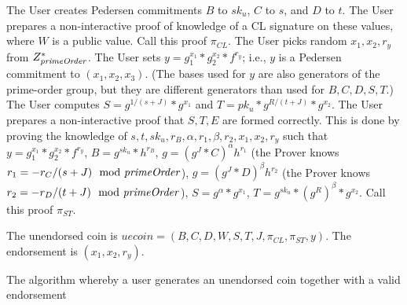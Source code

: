 \begin{algorithm}[H]\label{spendEndorsed}
\dontprintsemicolon

\BlankLine

 \;
\Indp
  The User creates Pedersen commitments $B$ to $sk_u$, $C$ to $s$, and $D$ to $t$. The User prepares a non-interactive proof of knowledge of a CL signature on these values, where $W$ is a public value. Call this proof $\pi_{CL}$. \;
  The User picks random $x_1,x_2,r_y$ from $Z_{\mathit{primeOrder}}^*$. The User sets $y = g_1^{x_1} * g_2^{x_2} * f^{r_y}$; i.e., $y$ is a Pedersen commitment to $(x_1,x_2,x_3)$. (The bases used for $y$ are also generators of the prime-order group, but they are different generators than used for $B,C,D,S,T$.) \;
  The User computes $S = g^{1/(s+J)} * g^{x_1}$ and $T = pk_u * g^{R/(t+J)} * g^{x_2}$. \;
  The User prepares a non-interactive proof that $S,T,E$ are formed
  correctly. This is done by proving the knowledge of
  $s,t,sk_u,r_B,\alpha,r_1,\beta,r_2,x_1,x_2,r_y$ such that $y =
  g_1^{x_1} * g_2^{x_2} * f^{r_y}$, $B = g^{sk_u} * h^{r_B}$, $g =
  (g^J * C)^{\alpha} h^{r_1}$ (the Prover knows $r_1 = - r_C / (s+J)
  \mod {\mathit{primeOrder}}$), $g = (g^J * D)^{\beta} h^{r_2}$ (the Prover
  knows $r_2 = - r_D / (t+J) \mod {\mathit{primeOrder}}$), $S = g^{\alpha} *
  g^{x_1}$, $T = g^{sk_u} * (g^R)^{\beta} * g^{x_2}$. Call this proof
  $\pi_{ST}$. \;

  The unendorsed coin is $\mathit{uecoin}=(B,C,D,W,S,T,J,\pi_{CL},\pi_{ST},y)$. \;
  The endorsement is $(x_1,x_2,r_y)$.\;
\Indm

\caption{The algorithm whereby a user generates an unendorsed coin together with a valid endorsement}
\end{algorithm}



